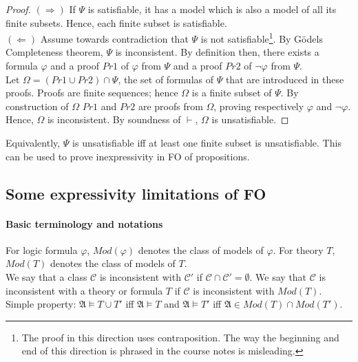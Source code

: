 \documentclass[10pt,a4paper]{article}
\theoremstyle{definition}
\begin{document}
\begin{proof}
$(\Rightarrow)$ If $\Psi$ is satisfiable, it has a model which is also a model of all its finite subsets. Hence, each finite subset is satisfiable.\\

$(\Leftarrow)$ Assume towards contradiction that $\Psi$ is not satisfiable\footnote{The proof in this direction uses contraposition. The way the beginning and end of this direction is phrased in the course notes is misleading.}. By G\"{o}dels Completeness theorem, $\Psi$ is inconsistent. By definition then, there exists a formula $\varphi$ and a proof $Pr1$ of $\varphi$ from $\Psi$ and a proof $Pr2$ of $\lnot\varphi$ from $\Psi$. \\
Let $\Omega = (Pr1 \cup Pr2) \cap \Psi$, the set of formulas of $\Psi$ that are introduced in these proofs. Proofs are finite sequences; hence $\Omega$ is a finite subset of $\Psi$. By construction of $\Omega$ $Pr1$ and $Pr2$ are proofs from $\Omega$, proving respectively $\varphi$ and $\lnot \varphi$. Hence, $\Omega$ is inconsistent. By soundness of $\vdash$, $\Omega$ is unsatisfiable. 
\end{proof} 

\noindent
Equivalently, $\Psi$ is unsatisfiable iff at least one finite subset is unsatisfiable. This can be used to prove inexpressivity in FO of propositions.


\subsection{Some expressivity limitations of FO}

\paragraph{Basic terminology and notations} For logic formula $\varphi$, $Mod(\varphi)$ denotes the class of models of $\varphi$. For theory $T$, $Mod(T)$ denotes the class of models of $T$. \\

\noindent
We say that a class $\mathcal{C}$ is inconsistent with $\mathcal{C'}$ if $\mathcal{C} \cap \mathcal{C'} = \emptyset$. We say that $\mathcal{C}$ is inconsistent with a theory or formula $T$ if $\mathcal{C}$ is inconsistent with $Mod(T)$. \\

\noindent
Simple property: $\mathfrak{A} \models T \cup T'$ iff $\mathfrak{A} \models T$ and $\mathfrak{A} \models T'$ iff $\mathfrak{A} \in Mod(T) \cap Mod(T')$. \\
\end{document}
